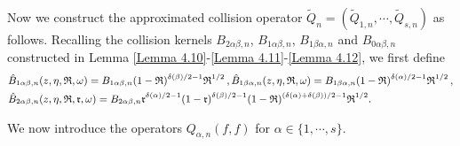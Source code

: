 \documentclass[reqno,11pt]{amsart}
\numberwithin{equation}{section}
\begin{document}
Now we construct the approximated collision operator  $\tilde{Q}_n=(\tilde{Q}_{1,n},\cdots,\tilde{Q}_{s,n} )$ as follows. Recalling the collision kernels $B_{2 \alpha \beta,n}$, $B_{1 \alpha \beta,n}$, $B_{1 \beta \alpha,n}$ and $B_{0 \alpha \beta,n}$ constructed in Lemma \ref{Lemma 4.10}-\ref{Lemma 4.11}-\ref{Lemma 4.12}, we first define
\begin{equation*}{\small
     \begin{aligned}
 & \hat{B}_{1\alpha \beta,n}(z,\eta ,\mathfrak{R},\omega ) =B_{1\alpha \beta ,n } (1-\mathfrak{R})^{\delta(\beta )/2-1}\mathfrak{R}^{1/2} \,, \hat{B}_{1\beta \alpha,n }(z,\eta ,\mathfrak{R},\omega ) =B_{1\beta \alpha ,n }(1-\mathfrak{R})^{\delta(\alpha )/2-1}\mathfrak{R}^{1/2} \,, \\
  & \hat{B}_{2\alpha \beta ,n}(z,\eta ,\mathfrak{R}, \mathfrak{r} , \omega ) =B_{2\alpha \beta ,n } \mathfrak{r}^{\delta(\alpha)/2-1 }(1-\mathfrak{r})^{\delta(\beta )/2-1}(1-\mathfrak{R})^{(\delta(\alpha)+\delta(\beta ))/2-1} \mathfrak{R}^{1/2} .
     \end{aligned}}
 \end{equation*}
 
We now introduce the operators $Q_{\alpha, n} (f, f)$ for $\alpha \in \{ 1, \cdots, s \}$. 
\end{document}
